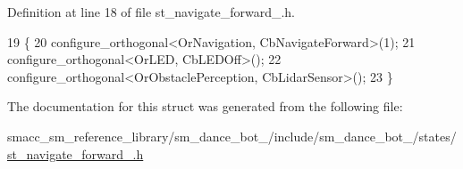 Definition at line 18 of file st\+\_\+navigate\+\_\+forward\+\_.\+h.


\begin{DoxyCode}
19   \{
20     configure\_orthogonal<OrNavigation, CbNavigateForward>(1);
21     configure\_orthogonal<OrLED, CbLEDOff>();
22     configure\_orthogonal<OrObstaclePerception, CbLidarSensor>();
23   \}
\end{DoxyCode}


The documentation for this struct was generated from the following file\+:\begin{DoxyCompactItemize}
\item 
smacc\+\_\+sm\+\_\+reference\+\_\+library/sm\+\_\+dance\+\_\+bot\+\_/include/sm\+\_\+dance\+\_\+bot\+\_/states/\hyperlink{3_2include_2sm__dance__bot__3_2states_2st__navigate__forward__2_8h}{st\+\_\+navigate\+\_\+forward\+\_.\+h}\end{DoxyCompactItemize}
